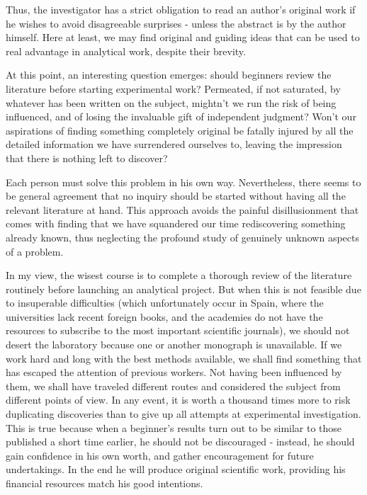 \documentclass{article}
\begin{document}
Thus, the investigator has a strict obligation to read an author’s original work if he wishes to avoid disagreeable surprises - unless the abstract is by the author himself. Here at least, we may find original and guiding ideas that can be used to real advantage in analytical work, despite their brevity.

At this point, an interesting question emerges: should beginners review the literature before starting experimental work? Permeated, if not saturated, by whatever has been written on the subject, mightn’t we run the risk of being influenced, and of losing the invaluable gift of independent judgment? Won’t our aspirations of finding something completely original be fatally injured by all the detailed information we have surrendered ourselves to, leaving the impression that there is nothing left to discover?

Each person must solve this problem in his own way. Nevertheless, there seems to be general agreement that no inquiry should be started without having all the relevant literature at hand. This approach avoids the painful disillusionment that comes with finding that we have squandered our time rediscovering something already known, thus neglecting the profound study of genuinely unknown aspects of a problem.

In my view, the wisest course is to complete a thorough review of the literature routinely before launching an analytical project. But when this is not feasible due to insuperable difficulties (which unfortunately occur in Spain, where the universities lack recent foreign books, and the academies do not have the resources to subscribe to the most important scientific journals), we should not desert the laboratory because one or another monograph is unavailable. If we work hard and long with the best methods available, we shall find something that has escaped the attention of previous workers. Not having been influenced by them, we shall have traveled different routes and considered the subject from different points of view. In any event, it is worth a thousand times more to risk duplicating discoveries than to give up all attempts at experimental investigation. This is true because when a beginner’s results turn out to be similar to those published a short time earlier, he should not be discouraged - instead, he should gain confidence in his own worth, and gather encouragement for future undertakings. In the end he will produce original scientific work, providing his financial resources match his good intentions.
\end{document}
